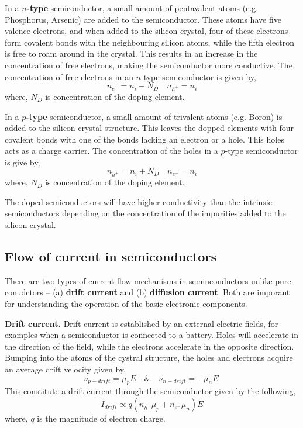 In a \textbf{$n$-type} semiconductor, a small amount of pentavalent atoms (e.g. Phosphorus, Arsenic) are added to the semiconductor. These atoms have five valence electrons, and when added to the silicon crystal, four of these electrons form covalent bonds with the neighbouring silicon atoms, while the fifth electron is free to roam around in the crystal. This results in an increase in the concentration of free electrons, making the semiconductor more conductive. The concentration of free electrons in an $n$-type semiconductor is given by,
\begin{equation}
    n_{e^-} = n_i + N_D \quad n_{h^+} = n_i
    \label{eq:ch03-n-type-elec-conc}
\end{equation}
where, $N_D$ is concentration of the doping element.

In a \textbf{$p$-type} semiconductor, a small amount of trivalent atoms (e.g. Boron) is added to the silicon crystal structure. This leaves the dopped elements with four covalent bonds with one of the bonds lacking an electron or a hole. This holes acts as a charge carrier. The concentration of the holes in a $p$-type semiconductor is give by,
\begin{equation}
    n_{h^+} = n_i + N_D \quad n_{e^-} = n_i
    \label{eq:ch03-p-type-elec-conc}
\end{equation}
where, $N_D$ is concentration of the doping element.

The doped semiconductors will have higher conductivity than the intrinsic semiconductors depending on the concentration of the impurities added to the silicon crystal.

\subsection{Flow of current in semiconductors}
There are two types of current flow mechanisms in seminconductors unlike pure conudctors -- (a) \textbf{drift current} and (b) \textbf{diffusion current}. Both are imporant for understanding the operation of the basic electronic components.

\noindent\textbf{Drift current.} Drift current is established by an external electric fields, for examples when a semiconductor is connected to a battery. Holes will accelerate in the direction of the field, while the electrons accelerate in the opposite direction. Bumping into the atoms of the cystral structure, the holes and electrons acquire an average drift velocity given by,
\begin{equation}
    \nu_{p-drift} = \mu_p E \quad \& \quad \nu_{n-drift} = -\mu_n E\
    \label{eq:ch03-drift-vel}
\end{equation}
This constitute a drift current through the semiconductor given by the following,
\begin{equation}
    I_{drift} \propto q\left(n_{h^+}\mu_p + n_{e^-}\mu_n \right) E
    \label{eq:ch03-drift-current}
\end{equation}
where, $q$ is the magnitude of electron charge.

